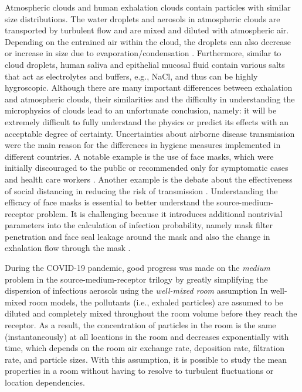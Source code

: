 \documentclass[preprint]{elsarticle}
\begin{document}
Atmospheric clouds and human exhalation clouds contain particles with similar size distributions. The water droplets and aerosols in atmospheric clouds are transported by turbulent flow and are mixed and diluted with atmospheric air.
Depending on the entrained air within the cloud, the droplets can also decrease or increase in size due to evaporation/condensation \cite{Bodenschatz2010}.
Furthermore, similar to cloud droplets, human saliva and epithelial mucosal fluid contain various salts that act as electrolytes and buffers, e.g., NaCl, and thus can be highly hygroscopic. Although there are many important differences between exhalation and atmospheric clouds, their similarities and the difficulty in understanding the microphysics of clouds lead to an unfortunate conclusion, namely: it will be extremely difficult  to fully understand the physics or predict its effects with an acceptable degree of certainty.
Uncertainties about airborne disease transmission were the main reason for the differences in hygiene measures implemented in different countries. A notable example is the use of face masks, which were initially discouraged to the public or recommended only for symptomatic cases and health care workers \cite{Greenhalgh2020}. Another example is the debate about the effectiveness of social distancing in reducing the risk of transmission \cite[see, e.g.,][]{Chu2020, Bazant2021}. Understanding the efficacy of face masks is essential to better understand the source-medium-receptor problem. It is challenging because it introduces additional nontrivial parameters into the calculation of infection probability, namely mask filter penetration and face seal leakage around the mask \cite{hinds1987performance, shaffer2009respiratory, holton1987particle, rengasamy2014quantitative} and also the change in exhalation flow through the mask \cite{Verma2020, Ishii2021}.



During the COVID-19 pandemic, good progress was made on the \emph{medium} problem in the source-medium-receptor trilogy by greatly simplifying the dispersion of infectious aerosols using the \emph{well-mixed room} assumption\cite[e.g.][]{Lelieveld2020, BUONANNO_2020, Miller_2020, Nordsiek2021, Bazant2021,Jimenez_COVID19app_CIRES_2020,heads}  In well-mixed room models, the pollutants (i.e., exhaled particles) are assumed to be diluted and completely mixed throughout the room volume before they reach the receptor. As a result, the concentration of particles in the room is the same (instantaneously) at all locations in the room and decreases exponentially with time, which depends on the room air exchange rate, deposition rate, filtration rate, and particle sizes. With this assumption, it is possible to study the mean properties in a room without having to resolve to turbulent fluctuations or location dependencies.
\end{document}
